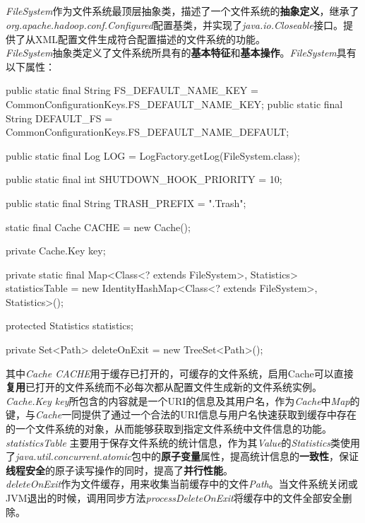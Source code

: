 \subsection{}
    \textit{FileSystem}作为文件系统最顶层抽象类，描述了一个文件系统的\textbf{抽象定义}，继承了\textit{org.apache.hadoop.conf.Configured}配置基类，并实现了\textit{java.io.Closeable}接口。提供了从XML配置文件生成符合配置描述的文件系统的功能。\\
    \textit{FileSystem}抽象类定义了文件系统所具有的\textbf{基本特征}和\textbf{基本操作}。\textit{FileSystem}具有以下属性：
    \begin{java}[caption=FileSystem attribute]
public static final String FS_DEFAULT_NAME_KEY = 
    CommonConfigurationKeys.FS_DEFAULT_NAME_KEY;
public static final String DEFAULT_FS = 
    CommonConfigurationKeys.FS_DEFAULT_NAME_DEFAULT;

public static final Log LOG = LogFactory.getLog(FileSystem.class);

public static final int SHUTDOWN_HOOK_PRIORITY = 10;

public static final String TRASH_PREFIX = ".Trash";

static final Cache CACHE = new Cache();

private Cache.Key key;

private static final Map<Class<? extends FileSystem>, Statistics> 
    statisticsTable =
        new IdentityHashMap<Class<? extends FileSystem>, Statistics>();

protected Statistics statistics;

private Set<Path> deleteOnExit = new TreeSet<Path>();

    \end{java}
    其中\textit{Cache CACHE}用于缓存已打开的，可缓存的文件系统，启用Cache可以直接\textbf{复用}已打开的文件系统而不必每次都从配置文件生成新的文件系统实例。\\
    \textit{Cache.Key key}所包含的内容就是一个URI的信息及其用户名，作为\textit{Cache}中\textit{Map}的键，与\textit{Cache}一同提供了通过一个合法的URI信息与用户名快速获取到缓存中存在的一个文件系统的对象，从而能够获取到指定文件系统中文件信息的功能。\\
    \textit{statisticsTable} 主要用于保存文件系统的统计信息，作为其\textit{Value}的\textit{Statistics}类使用了\textit{java.util.concurrent.atomic}包中的\textbf{原子变量}属性，提高统计信息的\textbf{一致性}，保证\textbf{线程安全}的原子读写操作的同时，提高了\textbf{并行性能}。\\
        \textit{deleteOnExit}作为文件缓存，用来收集当前缓存中的文件\textit{Path}。当文件系统关闭或JVM退出的时候，调用同步方法\textit{processDeleteOnExit}将缓存中的文件全部安全删除。\\
